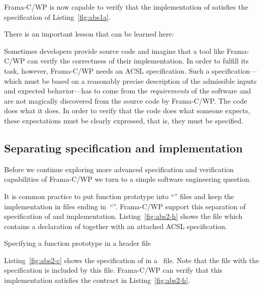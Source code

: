 Frama-C\slash WP is now capable to verify that the implementation of
 satisfies the specification of Listing~\ref{fig:abs1a}.

There is an important lesson that can be learned here:
\begin{framed}
\label{lesson}
Sometimes developers provide source code and imagine that a tool
like Frama-C\slash WP can verify the correctness of their implementation.
In order to fulfill its task, however, Frama-C\slash WP needs an ACSL specification. 
Such a specification---which must be based on a reasonably precise description of the
admissible inputs and expected behavior---has to come from the \emph{requirements}
of the software and are not magically discovered from the source code by Frama-C\slash WP.
The code does what it does. 
In order to verify that the code does what someone expects, these expectations
must be clearly expressed, that is, they must be specified.
\end{framed}

\clearpage

\subsection{Separating specification and implementation}

Before we continue exploring more advanced specification and verification
capabilities of Frama-C\slash WP we turn to a simple software engineering question.

It is common practice to put function prototype into ``'' files and
keep the implementation in files ending in~``''.
Frama-C\slash WP support this separation of specification of and implementation.
Listing~\ref{fig:abs2-h} shows the file  which contains
a declaration of  together with an attached ACSL specification.

\begin{listing}[hbt]
\begin{minipage}{\textwidth}

\end{minipage}
\caption{\label{fig:abs2-h} Specifying a function prototype in a header file}
\end{listing}

Listing~\ref{fig:abs2-c} shows the specification of  in a~ file.
Note that the file  with the specification is included by this file.
Frama-C\slash WP can verify that this implementation satisfies the contract in
Listing~\ref{fig:abs2-h}.



